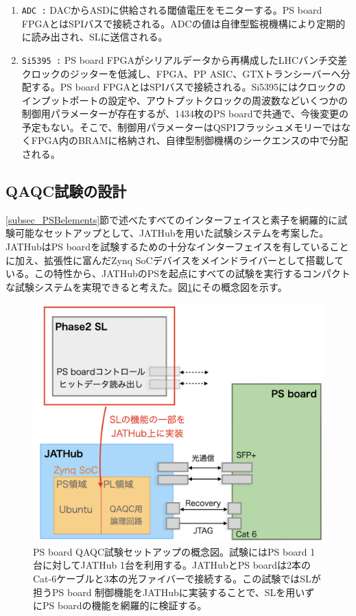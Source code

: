 \begin{enumerate}
    \item  \texttt{ADC :} DACからASDに供給される閾値電圧をモニターする。PS board FPGAとはSPIバスで接続される。ADCの値は自律型監視機構により定期的に読み出され、SLに送信される。
    \baselineskip

    \item \texttt{Si5395 :} PS board FPGAがシリアルデータから再構成したLHCバンチ交差クロックのジッターを低減し、FPGA、PP ASIC、GTXトランシーバーへ分配する。PS board FPGAとはSPIバスで接続される。Si5395にはクロックのインプットポートの設定や、アウトプットクロックの周波数などいくつかの制御用パラメーターが存在するが、1434枚のPS boardで共通で、今後変更の予定もない。そこで、制御用パラメーターはQSPIフラッシュメモリーではなくFPGA内のBRAMに格納され、自律型制御機構のシークエンスの中で分配される。
    \baselineskip

\end{enumerate}

\subsection{QAQC試験の設計}
\label{subsec_QAQCdesign}
\ref{subsec_PSBelements}節で述べたすべてのインターフェイスと素子を網羅的に試験可能なセットアップとして、JATHubを用いた試験システムを考案した。JATHubはPS boardを試験するための十分なインターフェイスを有していることに加え、拡張性に富んだZynq SoCデバイスをメインドライバーとして搭載している。この特性から、JATHubのPSを起点にすべての試験を実行するコンパクトな試験システムを実現できると考えた。図\ref{PSBtestdesign}にその概念図を示す。

\begin{figure} 
\centering
\includegraphics[width=16cm]{fig/QAQC/PSBtestdesign.png}
\caption[PS board QAQC試験セットアップの概念図]{PS board QAQC試験セットアップの概念図。試験にはPS board 1台に対してJATHub 1台を利用する。JATHubとPS boardは2本のCat-6ケーブルと3本の光ファイバーで接続する。この試験ではSLが担うPS board 制御機能をJATHubに実装することで、SLを用いずにPS boardの機能を網羅的に検証する。}
\label{PSBtestdesign}
\end{figure}

